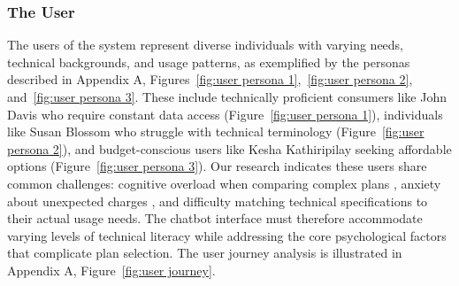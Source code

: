 \documentclass[conference]{IEEEtran}
\begin{document}
\subsubsection{The User}
The users of the system represent diverse individuals with varying needs, technical backgrounds, and usage patterns, as exemplified by the personas described in Appendix A, Figures~\ref{fig:user persona 1},~\ref{fig:user persona 2}, and~\ref{fig:user persona 3}. These include technically proficient consumers like John Davis who require constant data access (Figure~\ref{fig:user persona 1}), individuals like Susan Blossom who struggle with technical terminology (Figure~\ref{fig:user persona 2}), and budget-conscious users like Kesha Kathiripilay seeking affordable options (Figure~\ref{fig:user persona 3}). Our research indicates these users share common challenges: cognitive overload when comparing complex plans \cite{b1}, anxiety about unexpected charges \cite{b3}, and difficulty matching technical specifications to their actual usage needs. The chatbot interface must therefore accommodate varying levels of technical literacy while addressing the core psychological factors that complicate plan selection. The user journey analysis is illustrated in Appendix A, Figure~\ref{fig:user journey}.
\end{document}
